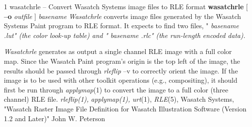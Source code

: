\newpage


%
%
%
 1
wasatchrle -- Convert Wasatch Systems image files to RLE format
{\bf wasatchrle} 
[
{\bf --o}
{\it outfile}
]
{\it basename}
{\it Wasatchrle}
converts image files generated by the Wasatch Systems Paint program
to RLE format.  It expects to find two files, 
"%
\it basename%
\rm .lut" (the color look-up table) and "%
\it basename%
\rm .rlc" 
(the run-length encoded data).

{\it Wasatchrle}
generates as output a single channel RLE image with a full
color map.  Since the Wasatch Paint program's origin is the top left
of the image, the results should be passed through
{\it rleflip} --v
to correctly orient the image.  If the image is to be used with other
toolkit operations (e.g., compositing), it should first be run through
{\it applymap}{\rm (1)}
to convert the image to a full color (three channel) RLE
file.
{\it rleflip(1),}
{\it applymap(1),}
{\it urt}{\rm (1),}
{\it RLE}{\rm (5),}
\nwl
Wasatch Systems, "Wasatch Raster Image File Definition for Wasatch
Illustration Software (Version 1.2 and Later)"
John W. Peterson

